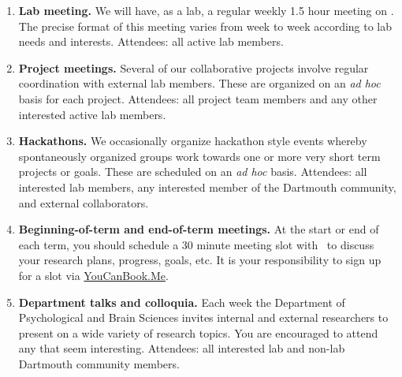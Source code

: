 \documentclass{tufte-book} %
\begin{document}
\begin{enumerate}
\item \textbf{Lab meeting.}  We will have, as a lab, a regular weekly
  1.5 hour meeting on \textbf{\labmeetingtime}.  The precise
  format of this meeting varies from week to week according to lab
  needs and interests. Attendees: all active lab members.

\item \textbf{Project meetings.}  Several of our collaborative
  projects involve regular coordination with external lab members.
  These are organized on an \textit{ad hoc} basis for each project.
  Attendees: all project team members and any other interested active
  lab members.

  \item \textbf{Hackathons.}  We occasionally organize hackathon
    style events whereby spontaneously organized groups work towards
    one or more very short term projects or goals.  These are
    scheduled on an \textit{ad hoc} basis.  Attendees: all interested
    lab members, any interested member of the Dartmouth community, and
    external collaborators.


  \item \textbf{Beginning-of-term and end-of-term meetings.} At the
    start or end of each term, you should schedule a 30 minute
    meeting slot with \director~to discuss your research
    plans, progress, goals, etc.  It is your responsibility to sign up
    for a slot via \href{https://context-lab.youcanbook.me/}{YouCanBook.Me}.

  \item \textbf{Department talks and colloquia.} Each week the
    Department of Psychological and Brain Sciences invites internal
    and external researchers to present on a wide variety of research
    topics.  You are encouraged to attend any that seem interesting.
    Attendees: all interested lab and non-lab Dartmouth community
    members.
    

\end{enumerate}
\end{document}
